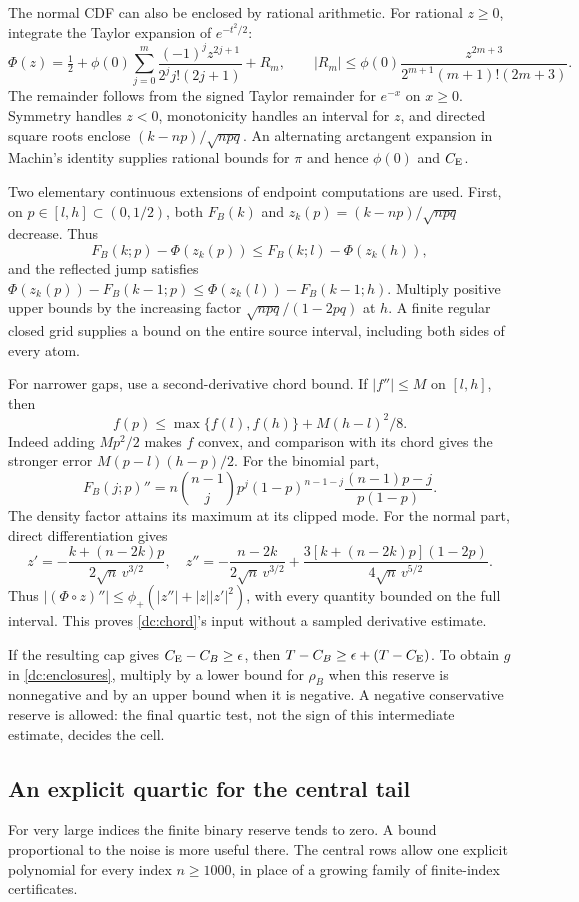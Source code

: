 The normal CDF can also be enclosed by rational arithmetic. For rational
$z\ge0$, integrate the Taylor expansion of $e^{-t^2/2}$:
\[
 \Phi(z)=\tfrac12+\phi(0)
 \sum_{j=0}^{m}\frac{(-1)^jz^{2j+1}}{2^jj!(2j+1)}+R_m,
 \qquad
 |R_m|\le\phi(0)\frac{z^{2m+3}}{2^{m+1}(m+1)!(2m+3)}.
\]
The remainder follows from the signed Taylor remainder for $e^{-x}$ on
$x\ge0$. Symmetry handles $z<0$, monotonicity handles an interval for $z$,
and directed square roots enclose $(k-np)/\sqrt{npq}$.
An alternating arctangent expansion in Machin's identity supplies rational
bounds for $\pi$ and hence $\phi(0)$ and $C_{\mathrm E}$.

Two elementary continuous extensions of endpoint computations are used.
First, on $p\in[l,h]\subset(0,1/2)$, both $F_B(k)$ and
$z_k(p)=(k-np)/\sqrt{npq}$ decrease. Thus
\[
 F_B(k;p)-\Phi(z_k(p))\le F_B(k;l)-\Phi(z_k(h)),
\]
and the reflected jump satisfies
$\Phi(z_k(p))-F_B(k-1;p)\le\Phi(z_k(l))-F_B(k-1;h)$.
Multiply positive upper bounds by the increasing factor
$\sqrt{npq}/(1-2pq)$ at $h$. A finite regular closed grid supplies a
bound on the entire source interval, including both sides of every atom.

For narrower gaps, use a second-derivative chord bound. If $|f''|\le M$
on $[l,h]$, then
\begin{equation}\label{dc:chord}
 f(p)\le\max\{f(l),f(h)\}+M(h-l)^2/8.
\end{equation}
Indeed adding $Mp^2/2$ makes $f$ convex, and comparison with its chord
gives the stronger error $M(p-l)(h-p)/2$.
For the binomial part,
\[
 F_B(j;p)''=n\binom{n-1}j p^j(1-p)^{n-1-j}
                 \frac{(n-1)p-j}{p(1-p)}.
\]
The density factor attains its maximum at its clipped mode. For the normal
part, direct differentiation gives
\[
 z'=-\frac{k+(n-2k)p}{2\sqrt n\,v^{3/2}},\quad
 z''=-\frac{n-2k}{2\sqrt n\,v^{3/2}}
       +\frac{3[k+(n-2k)p](1-2p)}{4\sqrt n\,v^{5/2}}.
\]
Thus $|(\Phi\circ z)''|\le\phi_+(|z''|+|z||z'|^2)$, with every
quantity bounded on the full interval. This proves \eqref{dc:chord}'s
input without a sampled derivative estimate.

If the resulting cap gives $C_{\mathrm E}-C_B\ge\epsilon$, then
$T-C_B\ge\epsilon+(T-C_{\mathrm E})$. To obtain $g$ in
\eqref{dc:enclosures}, multiply by a lower bound for $\rho_B$ when this
reserve is nonnegative and by an upper bound when it is negative.
A negative conservative reserve is allowed: the final quartic test,
not the sign of this intermediate estimate, decides the cell.
\subsection{An explicit quartic for the central tail}
\label{dc:tail}
For very large indices the finite binary reserve tends to zero. A bound
proportional to the noise is more useful there. The central rows allow one
explicit polynomial for every index $n\ge1000$, in place of a growing
family of finite-index certificates.

